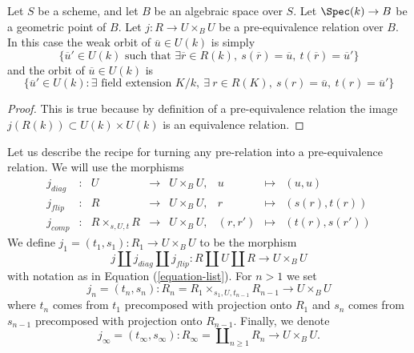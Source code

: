 \begin{lemma}
\label{lemma-weak-orbit-pre-equivalence}
Let $S$ be a scheme, and let $B$ be an algebraic space over $S$.
Let $\Spec(k) \to B$ be a geometric point of $B$.
Let $j : R \to U \times_B U$ be a pre-equivalence relation over $B$.
In this case the weak orbit of $\overline{u} \in U(k)$ is simply
$$
\{
\overline{u}' \in U(k)
\text{ such that }
\exists \overline{r} \in R(k),
\ s(\overline{r}) = \overline{u},
\ t(\overline{r}) = \overline{u}'
\}
$$
and the orbit of $\overline{u} \in U(k)$ is
$$
\{
\overline{u}' \in U(k) :
\exists\text{ field extension }K/k, \ \exists\ r \in R(K),
\ s(r) = \overline{u}, \ t(r) = \overline{u}'\}
$$
\end{lemma}

\begin{proof}
This is true because by definition of a pre-equivalence relation the image
$j(R(k)) \subset U(k) \times U(k)$ is an equivalence relation.
\end{proof}

\noindent
Let us describe the recipe for turning any pre-relation into a
pre-equivalence relation. We will use the morphisms
\begin{equation}
\label{equation-list}
\begin{matrix}
j_{diag} &
: &
U &
\longrightarrow &
U \times_B U, &
u &
\longmapsto &
(u, u) \\
j_{flip} &
: &
R &
\longrightarrow &
U \times_B U, &
r &
\longmapsto &
(s(r), t(r)) \\
j_{comp} &
: &
R \times_{s, U, t} R &
\longrightarrow &
U \times_B U, &
(r, r') &
\longmapsto &
(t(r), s(r'))
\end{matrix}
\end{equation}
We define $j_1 = (t_1, s_1) : R_1 \to U \times_B U$ to be the morphism
$$
j \amalg j_{diag} \amalg j_{flip} :
R \amalg U \amalg R
\longrightarrow
U \times_B U
$$
with notation as in
Equation (\ref{equation-list}).
For $n > 1$ we set
$$
j_n = (t_n, s_n) :
R_n = R_1 \times_{s_1, U, t_{n - 1}} R_{n - 1} \longrightarrow U \times_B U
$$
where $t_n$ comes from $t_1$ precomposed with projection onto $R_1$ and
$s_n$ comes from $s_{n - 1}$ precomposed with projection onto $R_{n - 1}$.
Finally, we denote
$$
j_\infty = (t_\infty, s_\infty) :
R_\infty = \coprod\nolimits_{n \geq 1} R_n
\longrightarrow
U \times_B U.
$$


